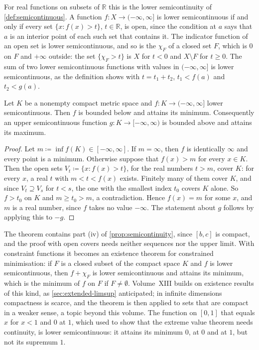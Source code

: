 For real functions on subsets of $\mathbb R$ this is the lower semicontinuity of \cref{def:semicontinuous}. A function $f\colon X\to(-\infty,\infty]$ is lower semicontinuous if and only if every set $\{x: f(x)>t\}$, $t\in\mathbb R$, is open, since the condition at $a$ says that $a$ is an interior point of each such set that contains it. The indicator function of an open set is lower semicontinuous, and so is the  $\chi_F$ of a closed set $F$, which is $0$ on $F$ and $+\infty$ outside: the set $\{\chi_F>t\}$ is $X$ for $t<0$ and $X\setminus F$ for $t\ge0$. The sum of two lower semicontinuous functions with values in $(-\infty,\infty]$ is lower semicontinuous, as the definition shows with $t=t_1+t_2$, $t_1<f(a)$ and $t_2<g(a)$.

\begin{theorem}
\label{thm:lsc-minimum}
Let $K$ be a nonempty compact metric space and $f\colon K\to(-\infty,\infty]$ lower semicontinuous. Then $f$ is bounded below and attains its minimum. Consequently an upper semicontinuous function $g\colon K\to[-\infty,\infty)$ is bounded above and attains its maximum.
\end{theorem}

\begin{proof}
Let $m\coloneqq\inf f(K)\in[-\infty,\infty]$. If $m=\infty$, then $f$ is identically $\infty$ and every point is a minimum. Otherwise suppose that $f(x)>m$ for every $x\in K$. Then the open sets $V_t\coloneqq\{x: f(x)>t\}$, for the real numbers $t>m$, cover $K$: for every $x$, a real $t$ with $m<t<f(x)$ exists. Finitely many of them cover $K$, and since $V_t\supseteq V_s$ for $t<s$, the one with the smallest index $t_0$ covers $K$ alone. So $f>t_0$ on $K$ and $m\ge t_0>m$, a contradiction. Hence $f(x)=m$ for some $x$, and $m$ is a real number, since $f$ takes no value $-\infty$. The statement about $g$ follows by applying this to $-g$.
\end{proof}

The theorem contains part (iv) of \cref{prop:semicontinuity}, since $[b,c]$ is compact, and the proof with open covers needs neither sequences nor the upper limit. With constraint functions it becomes an existence theorem for constrained minimisation: if $F$ is a closed subset of the compact space $K$ and $f$ is lower semicontinuous, then $f+\chi_F$ is lower semicontinuous and attains its minimum, which is the minimum of $f$ on $F$ if $F\ne\emptyset$. Volume~XIII builds on existence results of this kind, as \cref{sec:extended-limsup} anticipated; in infinite dimensions compactness is scarce, and the theorem is then applied to sets that are compact in a weaker sense, a topic beyond this volume. The function on $[0,1]$ that equals $x$ for $x<1$ and $0$ at $1$, which  used to show that the extreme value theorem needs continuity, is lower semicontinuous: it attains its minimum $0$, at $0$ and at $1$, but not its supremum $1$.

